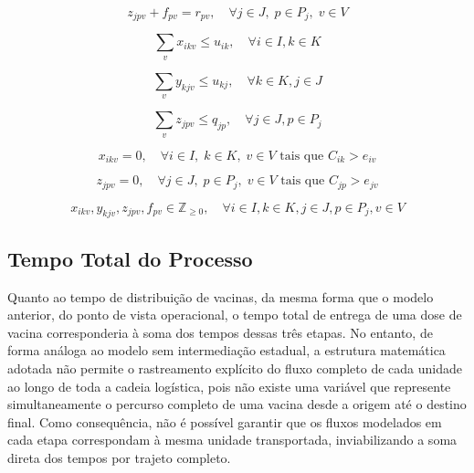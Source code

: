 \begin{equation*}
z_{jpv} + f_{pv} = r_{pv}, \quad \forall j \in J,\; p \in P_j,\; v \in V
\end{equation*}

\begin{equation*}
\sum_{v} x_{ikv} \le u_{ik}, \quad \forall i \in I, k \in K
\end{equation*}

\begin{equation*}
\sum_{v} y_{kjv} \le u_{kj}, \quad \forall k \in K, j \in J
\end{equation*}

\begin{equation*}
\sum_{v} z_{jpv} \le q_{jp}, \quad \forall j \in J, p \in P_j
\end{equation*}

\begin{equation*}
    x_{ikv} = 0, \quad \forall i \in I, \; k \in K, \; v \in V \text{ tais que } C_{ik} > e_{iv}
\end{equation*}

\begin{equation*}
    z_{jpv} = 0, \quad \forall j \in J, \; p \in P_j, \; v \in V \text{ tais que } C_{jp} > e_{jv}
\end{equation*}

\begin{equation*}
x_{ikv}, y_{kjv}, z_{jpv}, f_{pv} \in \mathbb{Z}_{\geq 0}, \quad \forall i \in I, k \in K, j \in J, p \in P_j, v \in V
\end{equation*}

\subsection{Tempo Total do Processo}

Quanto ao tempo de distribuição de vacinas, da mesma forma que o modelo anterior, do ponto de vista operacional, o tempo total de entrega de uma dose de vacina corresponderia à soma dos tempos dessas três etapas. No entanto, de forma análoga ao modelo sem intermediação estadual, a estrutura matemática adotada não permite o rastreamento explícito do fluxo completo de cada unidade ao longo de toda a cadeia logística, pois não existe uma variável que represente simultaneamente o percurso completo de uma vacina desde a origem até o destino final. Como consequência, não é possível garantir que os fluxos modelados em cada etapa correspondam à mesma unidade transportada, inviabilizando a soma direta dos tempos por trajeto completo.

